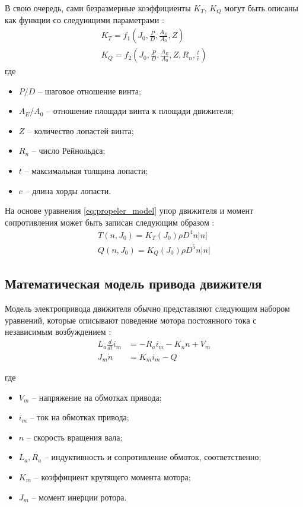 В свою очередь, сами безразмерные коэффициенты $K_T$, $K_Q$ могут быть описаны как функции со следующими параметрами \cite{oosterveld1975further}:
\begin{gather*}
    K_T = f_1 \left( J_0, \frac{P}{D}, \frac{A_E}{A_0}, Z \right) \\
    K_Q = f_2 \left( J_0, \frac{P}{D}, \frac{A_E}{A_0}, Z, R_n, \frac{t}{c} \right) 
\end{gather*}
\noindent где
\begin{itemize}
    \item $P/D$ -- шаговое отношение винта;
    \item $A_E/A_0$ -- отношение площади винта к площади движителя;
    \item $Z$ -- количество лопастей винта;
    \item $R_n$ -- число Рейнольдса;
    \item $t$ -- максимальная толщина лопасти;
    \item $c$ -- длина хорды лопасти.
\end{itemize}

На основе уравнения \ref{eq:propeler_model} упор движителя и момент сопротивления может быть записан следующим образом \cite{пантов1973основы}:
\begin{equation}
    \label{eq:kt_kq}
    \begin{array}{l}
        T(n, J_0) = K_T (J_0) \rho D^4 n |n|\\
        Q(n, J_0) = K_Q (J_0) \rho D^5 n |n|
    \end{array}
\end{equation}

\subsection{Математическая модель привода движителя}

Модель электропривода движителя обычно представляют следующим набором уравнений, которые описывают поведение мотора постоянного тока с независимым возбуждением \cite{zhao2015torque}:
\begin{equation}
	\label{eq:motor_model}
	\begin{array}{ll}
	L_a\frac{d}{dt}i_m &=-R_ai_m-K_n n + V_m \\
    J_m\dot{n} &= K_m i_m - Q
	\end{array}
\end{equation}

\noindent где
\begin{itemize}
    \item $V_m$ -- напряжение на обмотках привода;
    \item $i_m$ -- ток на обмотках привода;
    \item $n$ -- скорость вращения вала;
    \item $L_a, R_a$ -- индуктивность и сопротивление обмоток, соответственно;
    \item $K_m$ -- коэффициент крутящего момента мотора;
    \item $J_m$ -- момент инерции ротора.
\end{itemize}

